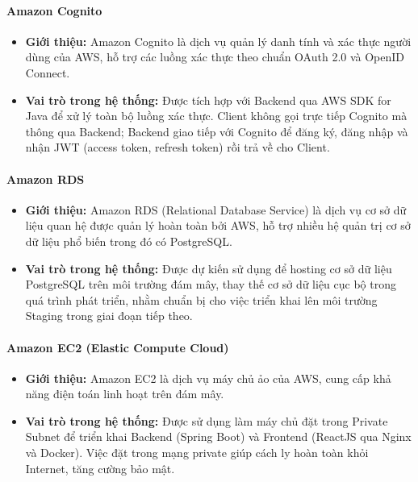 \paragraph{Amazon Cognito}
\begin{itemize}
    \item \textbf{Giới thiệu:} Amazon Cognito là dịch vụ quản lý danh tính và xác thực người dùng của AWS, hỗ trợ các luồng xác thực theo chuẩn OAuth 2.0 và OpenID Connect.
    \item \textbf{Vai trò trong hệ thống:} Được tích hợp với Backend qua AWS SDK for Java để xử lý toàn bộ luồng xác thực. Client không gọi trực tiếp Cognito mà thông qua Backend; Backend giao tiếp với Cognito để đăng ký, đăng nhập và nhận JWT (access token, refresh token) rồi trả về cho Client.
\end{itemize}

\paragraph{Amazon RDS}
\begin{itemize}
    \item \textbf{Giới thiệu:} Amazon RDS (Relational Database Service) là dịch vụ cơ sở dữ liệu quan hệ được quản lý hoàn toàn bởi AWS, hỗ trợ nhiều hệ quản trị cơ sở dữ liệu phổ biến trong đó có PostgreSQL.
    \item \textbf{Vai trò trong hệ thống:} Được dự kiến sử dụng để hosting cơ sở dữ liệu PostgreSQL trên môi trường đám mây, thay thế cơ sở dữ liệu cục bộ trong quá trình phát triển, nhằm chuẩn bị cho việc triển khai lên môi trường Staging trong giai đoạn tiếp theo.
\end{itemize}

\paragraph{Amazon EC2 (Elastic Compute Cloud)}
\begin{itemize}
    \item \textbf{Giới thiệu:} Amazon EC2 là dịch vụ máy chủ ảo của AWS, cung cấp khả năng điện toán linh hoạt trên đám mây.
    \item \textbf{Vai trò trong hệ thống:} Được sử dụng làm máy chủ đặt trong Private Subnet để triển khai Backend (Spring Boot) và Frontend (ReactJS qua Nginx và Docker). Việc đặt trong mạng private giúp cách ly hoàn toàn khỏi Internet, tăng cường bảo mật.
\end{itemize}

